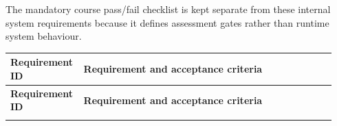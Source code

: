 \documentclass[11pt]{article}
\begin{document}
The mandatory course pass/fail checklist is kept separate from these internal
system requirements because it defines assessment gates rather than runtime
system behaviour.

\setlength{\LTpre}{0pt}
\setlength{\LTpost}{8pt}

\begin{longtable}[]{@{}
>{\raggedright\arraybackslash}p{0.18\linewidth}
>{\raggedright\arraybackslash}p{0.76\linewidth}@{}}
\toprule
\textbf{Requirement ID} & \textbf{Requirement and acceptance criteria} \\
\midrule
\endfirsthead

\toprule
\textbf{Requirement ID} & \textbf{Requirement and acceptance criteria} \\
\midrule
\endhead

\bottomrule
\endfoot


\end{longtable}
\end{document}
